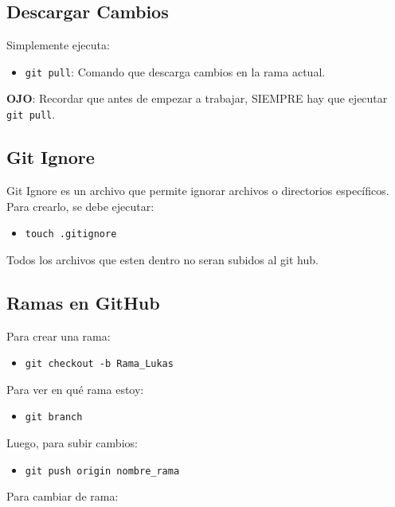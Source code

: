 \documentclass{article} %
\begin{document}
\subsection{Descargar Cambios}

Simplemente ejecuta:

\begin{itemize}
    \item \texttt{git pull}: Comando que descarga cambios en la rama actual.
\end{itemize}

\textbf{OJO}: Recordar que antes de empezar a trabajar, SIEMPRE hay que ejecutar \texttt{git pull}.

\subsection{Git Ignore}

Git Ignore es un archivo que permite ignorar archivos o directorios específicos. Para crearlo, se debe ejecutar:

\begin{itemize}
    \item \texttt{touch .gitignore}
\end{itemize}

Todos los archivos que esten dentro no seran subidos al git hub.

\subsection{Ramas en GitHub}

Para crear una rama:

\begin{itemize}
    \item \texttt{git checkout -b Rama\_Lukas}
\end{itemize}

Para ver en qué rama estoy:

\begin{itemize}
    \item \texttt{git branch}
\end{itemize}

Luego, para subir cambios:

\begin{itemize}
    \item \texttt{git push origin nombre\_rama}
\end{itemize}

Para cambiar de rama:
\end{document}
